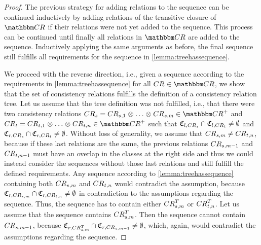 \begin{proof}
    The previous strategy for adding relations to the sequence can be continued inductively by adding relations of the transitive closure of $\consistencyrelationset{CR}$ if their relations were not yet added to the sequence.
    This process can be continued until finally all relations in $\consistencyrelationset{CR}$ are added to the sequence.
    Inductively applying the same arguments as before, the final sequence still fulfills all requirements for the sequence in \autoref{lemma:treehassequence}.
        
    We proceed with the reverse direction, i.e., given a sequence according to the requirements in \autoref{lemma:treehassequence} for all $\consistencyrelation{CR}{} \in \consistencyrelationset{CR}$, we show that the set of consistency relations fulfills the definition of a consistency relation tree.
    Let us assume that the tree definition was not fulfilled, i.e., that there were two consistency relations $\consistencyrelation{CR}{s} = \consistencyrelation{CR}{s,1} \concat \dots \concat \consistencyrelation{CR}{s,m} \in \transitiveclosure{\consistencyrelationset{CR}}$ and $\consistencyrelation{CR}{t} = \consistencyrelation{CR}{t,1} \concat \dots \concat \consistencyrelation{CR}{t,n} \in \transitiveclosure{\consistencyrelationset{CR}}$ such that $\classtuple{C}{l,\consistencyrelation{CR}{s}} \cap \classtuple{C}{l,\consistencyrelation{CR}{t}} \neq \emptyset$ and $\classtuple{C}{r,\consistencyrelation{CR}{s}} \cap \classtuple{C}{r,\consistencyrelation{CR}{t}} \neq \emptyset$.
    Without loss of generality, we assume that $\consistencyrelation{CR}{s,m} \neq \consistencyrelation{CR}{t,n}$, because if these last relations are the same, the previous relations $\consistencyrelation{CR}{s,m-1}$ and $\consistencyrelation{CR}{t,n-1}$ must have an overlap in the classes at the right side and thus we could instead consider the sequences without those last relations and still fulfill the defined requirements.
    Any sequence according to \autoref{lemma:treehassequence} containing both $\consistencyrelation{CR}{s,m}$ and $\consistencyrelation{CR}{t,n}$ would contradict the assumption, because $\classtuple{C}{r,\consistencyrelation{CR}{s,m}} \cap \classtuple{C}{r,\consistencyrelation{CR}{t,n}} \neq \emptyset$ in contradiction to the assumptions regarding the sequence.
    Thus, the sequence has to contain either $\consistencyrelation{CR}{s,m}^T$ or $\consistencyrelation{CR}{t,n}^T$.
    Let us assume that the sequence contains $\consistencyrelation{CR}{s,m}^T$.
    Then the sequence cannot contain $\consistencyrelation{CR}{s,m-1}$, because $\classtuple{C}{r,\consistencyrelation{CR}{s,m}^T} \cap \classtuple{C}{r,\consistencyrelation{CR}{s,m-1}} \neq \emptyset$, which, again, would contradict the assumptions regarding the sequence.

\end{proof}

